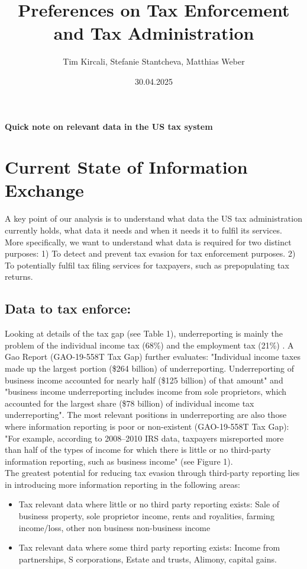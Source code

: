 \documentclass[12pt]{article}
\title{\textbf{\large{Preferences on Tax Enforcement and Tax Administration}}}
\author{\normalsize{Tim Kircali, Stefanie Stantcheva, Matthias Weber}}
\date{\normalsize{30.04.2025}}
\begin{document}
\maketitle
{}
\begin{center}
    \textbf{Quick note on relevant data in the US tax system}
\end{center}
\section{Current State of Information Exchange}
A key point of our analysis is to understand what data the US tax administration currently holds, what data it needs and when it needs it to fulfil its services.  More specifically, we want to understand what data is required for two distinct purposes: 1) To detect and prevent tax evasion for tax enforcement purposes. 2) To potentially fulfil tax filing services for taxpayers, such as prepopulating tax returns. 
\subsection{Data to tax enforce:} 
Looking at details of the tax gap (see Table 1), underreporting is mainly the problem of the individual income tax (68\%) and the employment tax (21\%) . A Gao Report (GAO-19-558T Tax Gap) further evaluates: "Individual income taxes made up the largest portion (\$264 billion) of underreporting. Underreporting of business income accounted for nearly half (\$125 billion) of that amount" and "business income underreporting includes income from sole proprietors, which accounted for the largest share (\$78 billion) of individual income tax underreporting". 
The most relevant positions in underreporting are also those where information reporting is poor or non-existent (GAO-19-558T Tax Gap): "For example, according to 2008–2010 IRS data, taxpayers misreported more than half of the types of income for which there is little or no third-party information reporting, such as business income" (see Figure 1). \\
The greatest potential for reducing tax evasion through third-party reporting lies in introducing more information reporting in the following areas:
\begin{itemize}
    \item Tax relevant data where little or no third party reporting exists: Sale of business property, sole proprietor income, rents and royalities, farming income/loss, other non business non-business income
    \item Tax relevant data where some third party reporting exists: Income from partnerships, S corporations, Estate and trusts, Alimony, capital gains. 
\end{itemize}
\end{document}
